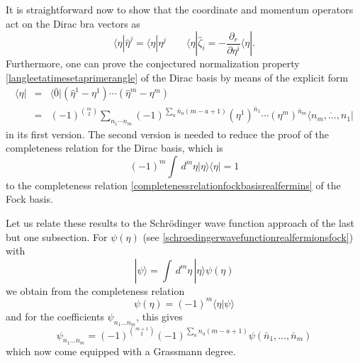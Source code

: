 \documentclass[a4paper,10pt]{article}
\begin{document}
It is straightforward now to show that the coordinate and momentum operators act on the 
Dirac bra vectors as
\begin{equation}
\langle\eta|\hat{\eta}^j=\langle\eta|\eta^j\qquad\langle\eta|\hat{\zeta}_i=
-\frac{\partial_r}{\partial\eta^i}\langle\eta|.
\end{equation}
Furthermore, one can prove the conjectured normalization property 
\eqref{langleetatimesetaprimerangle} of the Dirac basis by means of the explicit form
\begin{eqnarray}
\langle\eta|&=&\langle\bar{0}|(\hat{\eta}^1-\eta^1)\cdots(\hat{\eta}^m-\eta^m)\\ 
\nonumber
&=&(-1)^{{m \choose 2}}\sum_{n_1\cdots n_m}(-1)^{\sum_a\bar{n}_a(m-
a+1)}(\eta^1)^{\bar{n}_1}\cdots(\eta^m)^{\bar{n}_m}\langle\overline{n_m,\ldots,n_1}|
\end{eqnarray}
in its first version. The second version is needed to reduce the proof of the 
completeness relation for the Dirac basis, which is 
\begin{equation}
(-1)^m\int\,d^{m}\eta|\eta\rangle\langle\eta|=1
\end{equation}
to the completeness relation \eqref{completenessrelationfockbasisrealfermins} of the Fock 
basis. 

Let us relate these results to the Schr\"odinger wave function approach of the last but 
one subsection. For $\psi(\eta)$ (see \eqref{schroedingerwavefunctionrealfermionsfock}) 
with 
\begin{equation}
|\psi\rangle=\int\,d^{m}\eta\,|\eta\rangle\psi(\eta)
\end{equation}
we obtain from the completeness relation
\begin{equation}
\psi(\eta)=(-1)^m\langle\eta|\psi\rangle
\end{equation}
and for the coefficients $\psi_{n_1\ldots n_m}$, this gives
\begin{equation}
\psi_{n_1\ldots n_m}=(-1)^{{m+1 \choose 2}}(-1)^{\sum_an_a(m-
a+1)}\psi(\bar{n}_1,\ldots,\bar{n}_m)
\end{equation}
which now come equipped with a Grassmann degree.
\end{document}
